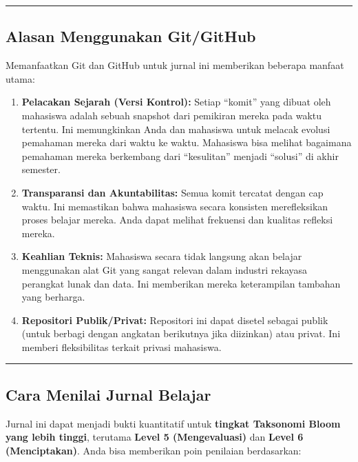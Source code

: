 \documentclass[
  letterpaper,
  DIV=11,
  numbers=noendperiod]{scrreprt}
\begin{document}
\begin{center}\rule{0.5\linewidth}{0.5pt}\end{center}

\subsection{Alasan Menggunakan
Git/GitHub}\label{alasan-menggunakan-gitgithub}

Memanfaatkan Git dan GitHub untuk jurnal ini memberikan beberapa manfaat
utama:

\begin{enumerate}
\def\labelenumi{\arabic{enumi}.}
\item
  \textbf{Pelacakan Sejarah (Versi Kontrol):} Setiap ``komit'' yang
  dibuat oleh mahasiswa adalah sebuah snapshot dari pemikiran mereka
  pada waktu tertentu. Ini memungkinkan Anda dan mahasiswa untuk melacak
  evolusi pemahaman mereka dari waktu ke waktu. Mahasiswa bisa melihat
  bagaimana pemahaman mereka berkembang dari ``kesulitan'' menjadi
  ``solusi'' di akhir semester.
\item
  \textbf{Transparansi dan Akuntabilitas:} Semua komit tercatat dengan
  cap waktu. Ini memastikan bahwa mahasiswa secara konsisten
  merefleksikan proses belajar mereka. Anda dapat melihat frekuensi dan
  kualitas refleksi mereka.
\item
  \textbf{Keahlian Teknis:} Mahasiswa secara tidak langsung akan belajar
  menggunakan alat Git yang sangat relevan dalam industri rekayasa
  perangkat lunak dan data. Ini memberikan mereka keterampilan tambahan
  yang berharga.
\item
  \textbf{Repositori Publik/Privat:} Repositori ini dapat disetel
  sebagai publik (untuk berbagi dengan angkatan berikutnya jika
  diizinkan) atau privat. Ini memberi fleksibilitas terkait privasi
  mahasiswa.
\end{enumerate}

\begin{center}\rule{0.5\linewidth}{0.5pt}\end{center}

\subsection{Cara Menilai Jurnal
Belajar}\label{cara-menilai-jurnal-belajar}

Jurnal ini dapat menjadi bukti kuantitatif untuk \textbf{tingkat
Taksonomi Bloom yang lebih tinggi}, terutama \textbf{Level 5
(Mengevaluasi)} dan \textbf{Level 6 (Menciptakan)}. Anda bisa memberikan
poin penilaian berdasarkan:
\end{document}
